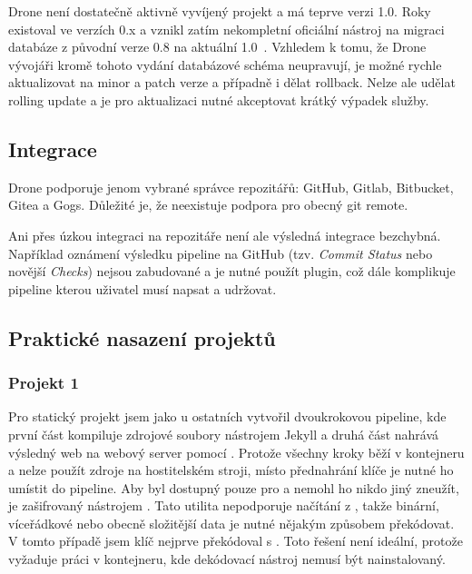         Drone není dostatečně aktivně vyvíjený projekt a má teprve verzi 1.0. Roky existoval ve verzích 0.x a vznikl zatím nekompletní oficiální nástroj na migraci databáze z původní verze 0.8 na aktuální 1.0~\cite{drone-mig}. Vzhledem k tomu, že Drone vývojáři kromě tohoto vydání databázové schéma neupravují, je možné rychle aktualizovat na minor a patch verze a případně i dělat rollback. Nelze ale udělat rolling update a je pro aktualizaci nutné akceptovat krátký výpadek služby.

    \subsection{Integrace}
        Drone podporuje jenom vybrané správce repozitářů: GitHub, Gitlab, Bitbucket, Gitea a Gogs. Důležité je, že neexistuje podpora pro obecný git remote.

        Ani přes úzkou integraci na repozitáře není ale výsledná integrace bezchybná. Například oznámení výsledku pipeline na GitHub (tzv. \textit{Commit Status} nebo novější \textit{Checks}) nejsou zabudované a je nutné použít plugin, což dále komplikuje pipeline kterou uživatel musí napsat a udržovat.


    \subsection{Praktické nasazení projektů}
        \subsubsection{Projekt 1}
            Pro statický projekt jsem jako u ostatních \CI vytvořil dvoukrokovou pipeline, kde první část kompiluje zdrojové soubory nástrojem Jekyll a druhá část nahrává výsledný web na webový server pomocí . Protože všechny kroky běží v kontejneru a nelze použít zdroje na hostitelském stroji, místo přednahrání  klíče je nutné ho umístit do pipeline. Aby byl dostupný pouze pro \CI a nemohl ho nikdo jiný zneužít, je zašifrovaný  nástrojem . Tato utilita nepodporuje načítání z , takže binární, víceřádkové nebo obecně složitější data je nutné nějakým způsobem překódovat. V tomto případě jsem klíč nejprve překódoval s . Toto řešení není ideální, protože vyžaduje práci v kontejneru, kde dekódovací nástroj nemusí být nainstalovaný.

